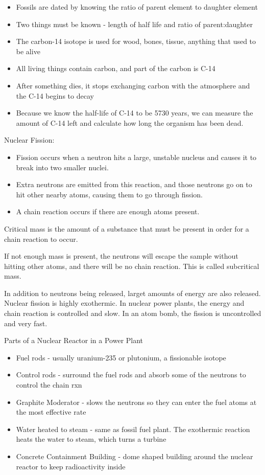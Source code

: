 \documentclass[../hchem.tex]{subfiles}
\begin{document}
\begin{itemize}
    \item Fossils are dated by knowing the ratio of parent element to daughter element 
    \item Two things must be known - length of half life and ratio of parent:daughter 
    \item The carbon-14 isotope is used for wood, bones, tissue, anything that used to be alive 
    \item All living things contain carbon, and part of the carbon is C-14 
    \item After something dies, it stops exchanging carbon with the atmosphere and the C-14 begins to decay 
    \item Because we know the half-life of C-14 to be 5730 years, we can measure the amount of C-14 left and calculate how long the organism has been dead.
\end{itemize}

Nuclear Fission:
\begin{itemize}
    \item Fission occurs when a neutron hits a large, unstable nucleus and causes it to break into two smaller nuclei.
    \item Extra neutrons are emitted from this reaction, and those neutrons go on to hit other nearby atoms, causing them to go through fission.
    \item A chain reaction occurs if there are enough atoms present.
\end{itemize}

Critical mass is the amount of a substance that must be present in order for a chain reaction to occur.

If not enough mass is present, the neutrons will escape the sample without hitting other atoms, and there will be no chain reaction. This is called subcritical mass.

In addition to neutrons being released, larget amounts of energy are also released. Nuclear fission is highly exothermic. In nuclear power plants, the energy and chain reaction is controlled and slow.
In an atom bomb, the fission is uncontrolled and very fast.

Parts of a Nuclear Reactor in a Power Plant 
\begin{itemize}
    \item Fuel rods - usually uranium-235 or plutonium, a fissionable isotope 
    \item Control rods - surround the fuel rods and absorb some of the neutrons to control the chain rxn 
    \item Graphite Moderator - slows the neutrons so they can enter the fuel atoms at the most effective rate 
    \item Water heated to steam - same as fossil fuel plant. The exothermic reaction heats the water to steam, which turns a turbine 
    \item Concrete Containment Building - dome shaped building around the nuclear reactor to keep radioactivity inside 
\end{itemize}
\end{document}
